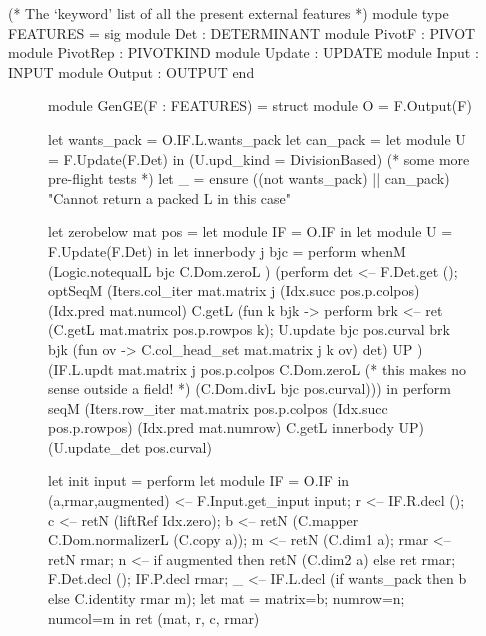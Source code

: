 \documentclass[draft]{elsart}
\begin{document}
\begin{code}
(* The `keyword' list of all the present external features *)
module type FEATURES = sig
  module Det       : DETERMINANT
  module PivotF    : PIVOT
  module PivotRep  : PIVOTKIND
  module Update    : UPDATE
  module Input     : INPUT
  module Output    : OUTPUT
end
\end{code}

\begin{figure}
\begin{code2}
module GenGE(F : FEATURES) = struct
    module O = F.Output(F)

    let wants_pack = O.IF.L.wants_pack
    let can_pack   = 
        let module U = F.Update(F.Det) in
        (U.upd_kind = DivisionBased)
    (* some more pre-flight tests *)
    let _ = ensure ((not wants_pack) || can_pack) 
           "Cannot return a packed L in this case"

    let zerobelow mat pos = 
        let module IF = O.IF in
        let module U = F.Update(F.Det) in
        let innerbody j bjc = perform
            whenM (Logic.notequalL bjc C.Dom.zeroL ) (perform
                det <-- F.Det.get ();
                optSeqM (Iters.col_iter mat.matrix j (Idx.succ pos.p.colpos) 
               (Idx.pred mat.numcol) C.getL
                      (fun k bjk -> perform
                      brk <-- ret (C.getL mat.matrix pos.p.rowpos k);
                      U.update bjc pos.curval brk bjk 
                          (fun ov -> C.col_head_set mat.matrix j k ov) det) UP )
                      (IF.L.updt mat.matrix j pos.p.colpos C.Dom.zeroL 
                          (* this makes no sense outside a field! *)
                          (C.Dom.divL bjc pos.curval))) in
        perform
              seqM (Iters.row_iter mat.matrix pos.p.colpos
              (Idx.succ pos.p.rowpos)
              (Idx.pred mat.numrow) C.getL innerbody UP) 
                   (U.update_det pos.curval)

   let init input = perform
        let module IF = O.IF in
          (a,rmar,augmented) <-- F.Input.get_input input;
          r <-- IF.R.decl ();
          c <-- retN (liftRef Idx.zero);
          b <-- retN (C.mapper C.Dom.normalizerL (C.copy a));
          m <-- retN (C.dim1 a);
          rmar <-- retN rmar;
          n <-- if augmented then retN (C.dim2 a) else ret rmar;
          F.Det.decl ();
          IF.P.decl rmar;
          _ <-- IF.L.decl (if wants_pack then b else C.identity rmar m);
          let mat = {matrix=b; numrow=n; numcol=m} in
          ret (mat, r, c, rmar)


\end{code2}
\end{figure}
\end{document}
